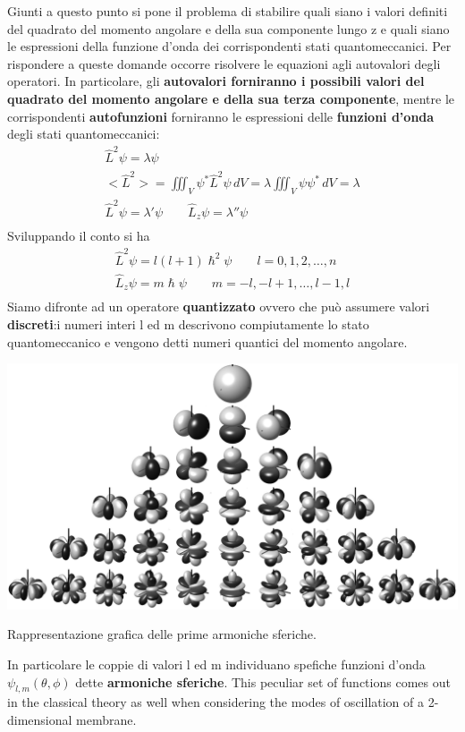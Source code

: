 Giunti a questo punto si pone il problema di stabilire quali siano i
valori definiti del quadrato del momento angolare e della sua componente
lungo z e quali siano le espressioni della funzione d'onda dei
corrispondenti stati quantomeccanici.
Per rispondere a queste domande
occorre risolvere le equazioni agli autovalori degli operatori.
In
particolare, gli \textbf{autovalori forniranno i possibili valori del
quadrato del momento angolare e della sua terza componente}, mentre le
corrispondenti \textbf{autofunzioni} forniranno le espressioni delle
\textbf{funzioni d'onda} degli stati quantomeccanici: \begin{gather*}
    \hat{L}^{2}\psi = \lambda \psi\\
    < \hat{L}^{2}> = \iiint_{V} \psi^{*} \hat{L}^{2}\psi \, dV = \lambda \iiint_{V} \psi \psi^{*} \, dV = \lambda\\
    \hat{L}^{2} \psi = \lambda' \psi \qquad  \hat{L}_{z} \psi = \lambda'' \psi\\
\end{gather*} Sviluppando il conto si ha \begin{gather*}
    \hat{L}^{2}\psi = l(l+1) \hslash^{2} \psi \qquad l = 0,1,2, \dots , n\\
    \hat{L}_{z} \psi = m \hslash \psi \qquad m = -l,-l + 1, \dots ,l-1, l\\
\end{gather*} Siamo difronte ad un operatore \textbf{quantizzato} ovvero che può
assumere valori \textbf{discreti}:i numeri interi l ed m descrivono
compiutamente lo stato quantomeccanico e vengono detti numeri quantici
del momento angolare.\\
\begin{marginfigure}
    \includegraphics{figs/spherical-harmonics}
    \caption{Rappresentazione grafica delle prime armoniche sferiche.}
    \label{fig:spherical-harmonics}
\end{marginfigure}
In particolare le coppie di valori l ed m individuano spefiche funzioni
d'onda \(\psi_{l,m}(\theta,\phi)\) dette \textbf{armoniche sferiche}.
This peculiar set of functions comes out in the classical theory as well
when considering the modes of oscillation of a 2-dimensional membrane.

